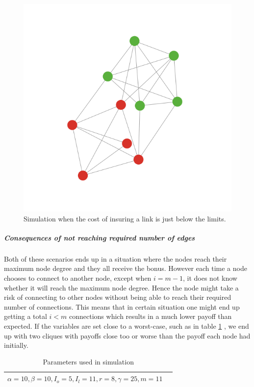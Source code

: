 \begin{figure}[h]
\centering
  \includegraphics[width=0.8\linewidth]{../Figures/BonusGameViolating.png}
  \caption{\label{fig:bonusviolating} Simulation when the cost of insuring a link is just below the limits. }
\end{figure}


\subparagraph{Consequences of not reaching required number of edges}
Both of these scenarios ends up in a situation where the nodes reach their maximum node degree and they all receive the bonus. However each time a node chooses to connect to another node, except when $i=m-1$, it does not know whether it will reach the maximum node degree. Hence the node might take a risk of connecting to other nodes without being able to reach their required number of connections. This means that in certain situation one might end up getting a total $i<m$ connections which results in a much lower payoff than expected. If the variables are set close to a worst-case, such as in table \ref{tbl:maxdegrevalueswitherror} , we end up with two cliques with payoffs close too or worse than the payoff each node had initially. 

\begin{table}[h]
\centering
\begin{tabular}{lc}
 \hline
  $\alpha=10,
  \beta=10,
  I_{o}=5,
  I_{l}=11,
  r=8,
  \gamma=25,
  m=11
  $
  \\
  \hline
\end{tabular}
\caption{Parameters used in simulation \label{tbl:maxdegrevalueswitherror}}
\end{table}


